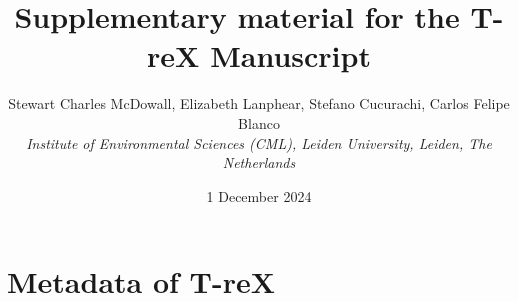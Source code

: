 \documentclass{article}
\begin{document}
\title{\textbf{Supplementary material for the T-reX Manuscript}}
\author{Stewart Charles McDowall, Elizabeth Lanphear, Stefano Cucurachi, Carlos Felipe Blanco  \\
    \textit{Institute of Environmental Sciences (CML), Leiden University, Leiden, The Netherlands}}
\date{1 December 2024}

\maketitle
\tableofcontents
\listoffigures
\listoftables
\clearpage




\section{Metadata of T-reX}
\end{document}
